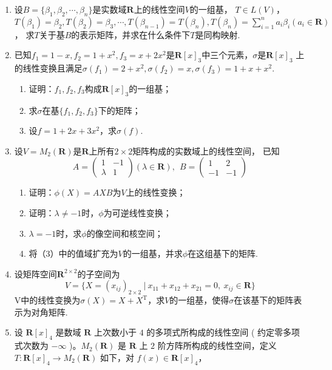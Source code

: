 \begin{enumerate}
    \item 设$B=\{\beta_1,\beta_2,\cdots,\beta_n\}$是实数域$\mathbf{R}$上的线性空间$V$的一组基，
	$T \in L(V)$，$T(\beta_1)=\beta_2,T(\beta_2)=\beta_3,\cdots,T(\beta_{n-1})=T(\beta_n),T(\beta_n)=\sum\limits_{i=1}^{n}a_i\beta_i(a_i \in \mathbf{R})$，
	求$T$关于基$B$的表示矩阵，并求在什么条件下$T$是同构映射.
    \item 已知$f_1=1-x,f_2=1+x^2,f_3=x+2x^2$是$\mathbf{R}[x]_3$中三个元素，$\sigma$是$\mathbf{R}[x]_3$
	上的线性变换且满足$\sigma(f_1)=2+x^2,\sigma(f_2)=x,\sigma(f_3)=1+x+x^2$.
    \begin{enumerate}[label=(\arabic*)]
        \item 证明：$f_1,f_2,f_3$构成$\mathbf{R}[x]_3$的一组基；
        \item 求$\sigma$在基$\{f_1,f_2,f_3\}$下的矩阵；
        \item 设$f=1+2x+3x^2$，求$\sigma(f)$.
    \end{enumerate}
	\item 设$V=M_2(\mathbf{R})$是$\mathbf{R}$上所有$2 \times 2$矩阵构成的实数域上的线性空间，
	已知
	\[A=\begin{pmatrix}1 & -1 \\ \lambda & 1 \end{pmatrix}(\lambda \in \mathbf{R}),\ \ B=\begin{pmatrix}1 & 2 \\ -1 & -1 \end{pmatrix}\]
    \begin{enumerate}[label=(\arabic*)]
        \item 证明：$\phi(X)=AXB$为$V$上的线性变换；
        \item 证明：$\lambda\neq-1$时，$\phi$为可逆线性变换；
        \item $\lambda=-1$时，求$\phi$的像空间和核空间；
        \item 将\textup{（3）}中的值域扩充为$V$的一组基，并求$\phi$在这组基下的矩阵.
    \end{enumerate}
	\item 设矩阵空间$\mathbf{R}^{2\times 2}$的子空间为
	\[V=\{X=(x_{ij})_{2\times 2}\ |\ x_{11}+x_{12}+x_{21}=0,\ x_{ij}\in \mathbf{R}\}\]
	V中的线性变换为$\sigma(X)=X+X^\mathrm{T}$，求$V$的一组基，使得$\sigma$在该基下的矩阵表示为对角矩阵.
	\item 设 $\mathbf{R}[x]_4$ 是数域 $\mathbf{R}$ 上次数小于 $4$ 的多项式所构成的线性空间 ( 约定零多项式次数为 $-\infty$ )。$M_2(\mathbf{R})$ 是 $\mathbf{R}$ 上 $2$ 阶方阵所构成的线性空间，定义 $T : \mathbf{R}[x]_4 \to M_2(\mathbf{R})$ 如下，对 $f(x) \in \mathbf{R}[x]_4$，

\end{enumerate}
